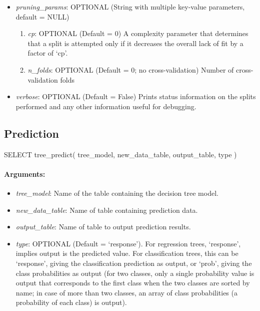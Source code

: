 \begin{itemize}
\begin{enumerate}
        \end{enumerate}
    \item \emph{pruning\_params}: OPTIONAL (String with multiple key-value parameters, default = NULL)
        \begin{enumerate}
                \item \emph{cp}: OPTIONAL (Default = 0)
                    A complexity parameter that determines that a split is attempted only if it
                    decreases the overall lack of fit by a factor of `cp'.
                \item \emph{n\_folds}: OPTIONAL (Default = 0; no cross-validation) Number of cross-validation folds
        \end{enumerate}
    \item \emph{verbose}: OPTIONAL (Default = False) Prints status information
     on the splits performed and any other information useful for debugging.
\end{itemize}

\subsection{Prediction} %
\label{sub:prediction}
\begin{sql}
    SELECT tree_predict(
            tree_model,
            new_data_table,
            output_table,
            type
    )
\end{sql}

\paragraph{Arguments:}

\begin{itemize}
    \item \emph{tree\_model}: Name of the table containing the decision tree model.
    \item \emph{new\_data\_table}: Name of table containing prediction data.
    \item \emph{output\_table}: Name of table to output prediction results.
    \item \emph{type}: OPTIONAL (Default = `response'). For regression trees,
    `response', implies output is the predicted value. For classification trees,
    this can be `response', giving the classification prediction as output, or
    `prob', giving the class probabilities as output
    (for two classes, only a single probability value is output that corresponds
    to the first class when the two classes are sorted by name;
    in case of more than two classes, an array of class probabilities
    (a probability of each class) is output).
\end{itemize}
